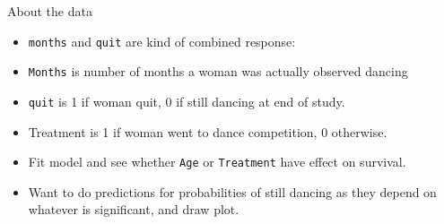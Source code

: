 \documentclass[ignorenonframetext,]{beamer}
\begin{document}
\begin{frame}[fragile]{About the data}
\protect\hypertarget{about-the-data}{}

\begin{itemize}
\item
  \texttt{months} and \texttt{quit} are kind of combined response:
\item
  \texttt{Months} is number of months a woman was actually observed
  dancing
\item
  \texttt{quit} is 1 if woman quit, 0 if still dancing at end of study.
\item
  Treatment is 1 if woman went to dance competition, 0 otherwise.
\item
  Fit model and see whether \texttt{Age} or \texttt{Treatment} have
  effect on survival.
\item
  Want to do predictions for probabilities of still dancing as they
  depend on whatever is significant, and draw plot.
\end{itemize}

\end{frame}
\end{document}

